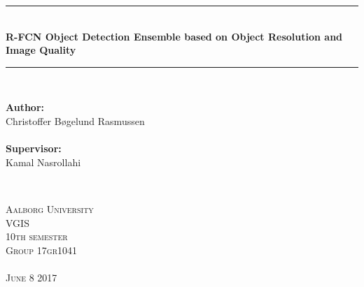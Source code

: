 \begin{titlepage}

\newcommand{\HRule}{\rule{\linewidth}{0.5mm}} %

\center %


\HRule \\[0.5cm]
{\LARGE \bfseries 
R-FCN Object Detection Ensemble based on Object Resolution and Image Quality
}\\[0.3cm]
\HRule \\[0.5cm]


\null
\vfill%

\begin{minipage}[b]{0.4\textwidth}
\begin{flushleft} \large
\textbf{Author:}\\
Christoffer Bøgelund Rasmussen\\
\emph{ }\\
\textbf{Supervisor:}\\
Kamal Nasrollahi\\
\end{flushleft}
\end{minipage}
~
\begin{minipage}[b]{0.4\textwidth}
\begin{flushright} \large
\textsc{\large Aalborg University}\\
\textsc{\large VGIS}\\ 
\textsc{\large 10th semester}\\
\textsc{\large Group 17gr1041}\\
\emph{ }\\
\textsc{\small June 8 2017}\\
\end{flushright}
\end{minipage}

\end{titlepage}
